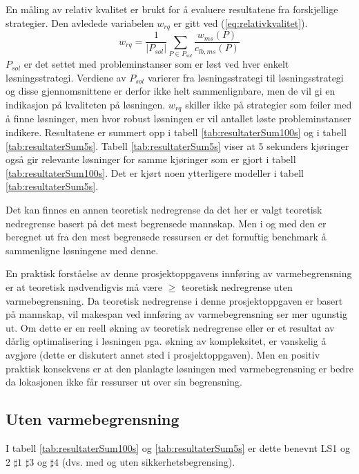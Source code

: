En måling av relativ kvalitet er brukt for å evaluere resultatene fra forskjellige strategier. Den avledede variabelen $w_{rq}$ er gitt ved (\ref{eq:relativkvalitet}).
\begin{equation}
w_{rq} = \frac{1}{| P_{sol} |} \sum_{P \in P_{sol}} \frac{w_{ms}(P)}{c_{lb,ms}(P)}
\label{eq:relativkvalitet}
\end{equation}
$P_{sol}$ er det settet med probleminstanser som er løst ved hver enkelt løsningsstrategi. Verdiene av $P_{sol}$ varierer fra løsningsstrategi til løsningsstrategi og disse gjennomsnittene er derfor ikke helt sammenlignbare, men de vil gi en indikasjon på kvaliteten på løsningen. $w_{rq}$ skiller ikke på strategier som feiler med å finne løsninger, men hvor robust løsningen er vil antallet løste probleminstanser indikere. Resultatene er summert opp i tabell \ref{tab:resultaterSum100s} og i tabell \ref{tab:resultaterSum5s}. Tabell \ref{tab:resultaterSum5s} viser at 5 sekunders kjøringer også gir relevante løsninger for samme kjøringer som er gjort i tabell \ref{tab:resultaterSum100s}. Det er kjørt noen ytterligere modeller i tabell \ref{tab:resultaterSum5s}.

Det kan finnes en annen teoretisk nedregrense da det her er valgt teoretisk nedregrense basert på det mest begrensede mannskap. Men i og med den er beregnet ut fra den mest begrensede ressursen er det fornuftig benchmark å sammenligne løsningene med denne.

En praktisk forståelse av denne prosjektoppgavens innføring av varmebegrensning er at teoretisk nødvendigvis må være $\ge$ teoretisk nedregrense uten varmebegrensning. Da teoretisk nedregrense i denne prosjektoppgaven er basert på mannskap, vil makespan ved innføring av varmebegrensning ser mer ugunstig ut. Om dette er en reell økning av teoretisk nedregrense eller er et resultat av dårlig optimalisering i løsningen pga. økning av kompleksitet, er vanskelig å avgjøre (dette er diskutert annet sted i prosjektoppgaven). Men en positiv praktisk konsekvens er at den planlagte løsningen med varmebegrensning er bedre da lokasjonen ikke får ressurser ut over sin begrensning.

\subsection{Uten varmebegrensning}
I tabell \ref{tab:resultaterSum100s} og \ref{tab:resultaterSum5s} er dette benevnt LS1 og 2 $\sharp 1$ $\sharp 3$ og $\sharp 4$ (dvs. med og uten sikkerhetsbegrensing).

